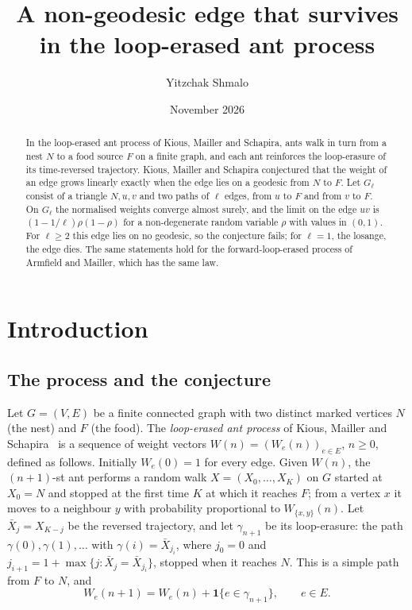 \documentclass[11pt]{amsart}
\title{A non-geodesic edge that survives in the loop-erased ant process}
\author{Yitzchak Shmalo}
\date{November 2026}
\theoremstyle{remark}
\newcommand{\one}{\mathbf{1}}
\begin{document}
\begin{abstract}
In the loop-erased ant process of Kious, Mailler and Schapira, ants walk in turn from a nest $N$ to a food source $F$
on a finite graph, and each ant reinforces the loop-erasure of its time-reversed trajectory. Kious, Mailler and
Schapira conjectured that the weight of an edge grows linearly exactly when the edge lies on a geodesic from $N$ to
$F$. Let $G_\ell$ consist of a triangle $N,u,v$ and two paths of $\ell$ edges, from $u$ to $F$ and from $v$ to $F$. On
$G_\ell$ the normalised weights converge almost surely, and the limit on the edge $uv$ is $(1-1/\ell)\rho(1-\rho)$ for
a non-degenerate random variable $\rho$ with values in $(0,1)$. For $\ell\ge2$ this edge lies on no geodesic, so the
conjecture fails; for $\ell=1$, the losange, the edge dies. The same statements hold for the forward-loop-erased
process of Armfield and Mailler, which has the same law.
\end{abstract}
\maketitle

\section{Introduction}\label{sec:intro}

\subsection{The process and the conjecture}
Let $G=(V,E)$ be a finite connected graph with two distinct marked vertices $N$ (the nest) and $F$ (the food). The
\emph{loop-erased ant process} of Kious, Mailler and Schapira~\cite{KMS} is a sequence of weight vectors
$W(n)=(W_e(n))_{e\in E}$, $n\ge0$, defined as follows. Initially $W_e(0)=1$ for every edge. Given $W(n)$, the
$(n+1)$-st ant performs a random walk $X=(X_0,\dots,X_K)$ on $G$ started at $X_0=N$ and stopped at the first time $K$
at which it reaches $F$; from a vertex $x$ it moves to a neighbour $y$ with probability proportional to
$W_{\{x,y\}}(n)$. Let $\bar X_j=X_{K-j}$ be the reversed trajectory, and let $\gamma_{n+1}$ be its loop-erasure: the
path $\gamma(0),\gamma(1),\dots$ with $\gamma(i)=\bar X_{j_i}$, where $j_0=0$ and
$j_{i+1}=1+\max\{j:\bar X_j=\bar X_{j_i}\}$, stopped when it reaches $N$. This is a simple path from $F$ to $N$, and
\[
W_e(n+1)=W_e(n)+\one\{e\in\gamma_{n+1}\},\qquad e\in E .
\]
\end{document}
